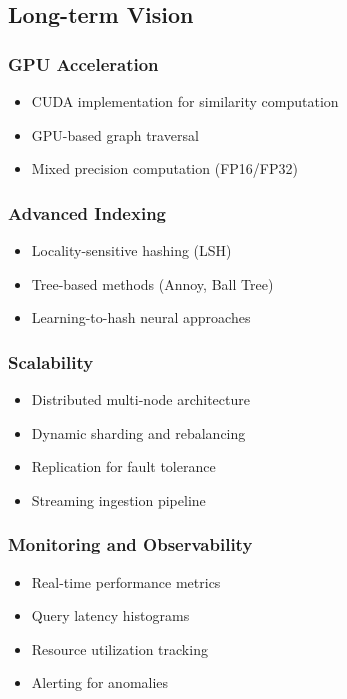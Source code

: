 \documentclass[12pt,a4paper]{article}
\begin{document}
\subsection{Long-term Vision}

\subsubsection{GPU Acceleration}
\begin{itemize}
    \item CUDA implementation for similarity computation
    \item GPU-based graph traversal
    \item Mixed precision computation (FP16/FP32)
\end{itemize}

\subsubsection{Advanced Indexing}
\begin{itemize}
    \item Locality-sensitive hashing (LSH)
    \item Tree-based methods (Annoy, Ball Tree)
    \item Learning-to-hash neural approaches
\end{itemize}

\subsubsection{Scalability}
\begin{itemize}
    \item Distributed multi-node architecture
    \item Dynamic sharding and rebalancing
    \item Replication for fault tolerance
    \item Streaming ingestion pipeline
\end{itemize}

\subsubsection{Monitoring and Observability}
\begin{itemize}
    \item Real-time performance metrics
    \item Query latency histograms
    \item Resource utilization tracking
    \item Alerting for anomalies
\end{itemize}
\end{document}
